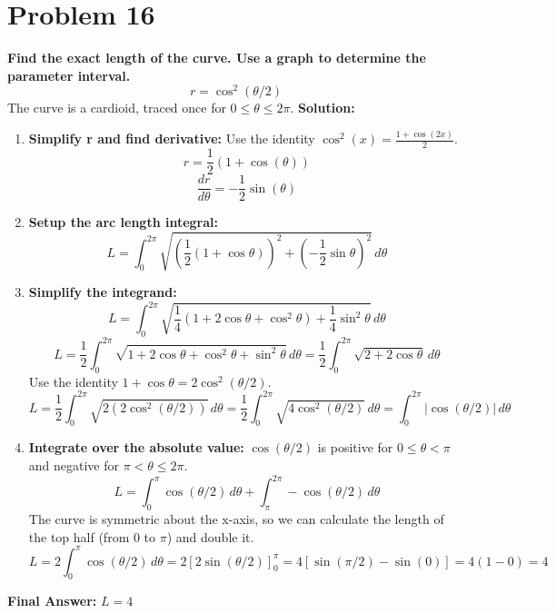 \documentclass{article}
\begin{document}
\section*{Problem 16}
\textbf{Find the exact length of the curve. Use a graph to determine the parameter interval.}
\[ r = \cos^2(\theta/2) \]
The curve is a cardioid, traced once for $0 \le \theta \le 2\pi$.
\textbf{Solution:}
\begin{enumerate}
    \item \textbf{Simplify r and find derivative:} Use the identity $\cos^2(x) = \frac{1+\cos(2x)}{2}$.
    \[ r = \frac{1}{2}(1 + \cos(\theta)) \]
    \[ \frac{dr}{d\theta} = -\frac{1}{2}\sin(\theta) \]
    \item \textbf{Setup the arc length integral:}
    \[ L = \int_{0}^{2\pi} \sqrt{\left(\frac{1}{2}(1+\cos\theta)\right)^2 + \left(-\frac{1}{2}\sin\theta\right)^2} \,d\theta \]
    \item \textbf{Simplify the integrand:}
    \[ L = \int_{0}^{2\pi} \sqrt{\frac{1}{4}(1+2\cos\theta+\cos^2\theta) + \frac{1}{4}\sin^2\theta} \,d\theta \]
    \[ L = \frac{1}{2} \int_{0}^{2\pi} \sqrt{1+2\cos\theta+\cos^2\theta+\sin^2\theta} \,d\theta = \frac{1}{2} \int_{0}^{2\pi} \sqrt{2+2\cos\theta} \,d\theta \]
    Use the identity $1+\cos\theta = 2\cos^2(\theta/2)$.
    \[ L = \frac{1}{2} \int_{0}^{2\pi} \sqrt{2(2\cos^2(\theta/2))} \,d\theta = \frac{1}{2} \int_{0}^{2\pi} \sqrt{4\cos^2(\theta/2)} \,d\theta = \int_{0}^{2\pi} |\cos(\theta/2)| \,d\theta \]
    \item \textbf{Integrate over the absolute value:} $\cos(\theta/2)$ is positive for $0 \le \theta < \pi$ and negative for $\pi < \theta \le 2\pi$.
    \[ L = \int_{0}^{\pi} \cos(\theta/2) \,d\theta + \int_{\pi}^{2\pi} -\cos(\theta/2) \,d\theta \]
    The curve is symmetric about the x-axis, so we can calculate the length of the top half (from 0 to $\pi$) and double it.
    \[ L = 2 \int_{0}^{\pi} \cos(\theta/2) \,d\theta = 2 \left[ 2\sin(\theta/2) \right]_{0}^{\pi} = 4 \left[ \sin(\pi/2) - \sin(0) \right] = 4(1 - 0) = 4 \]
\end{enumerate}
\textbf{Final Answer:} $L = 4$
\newpage
\end{document}

